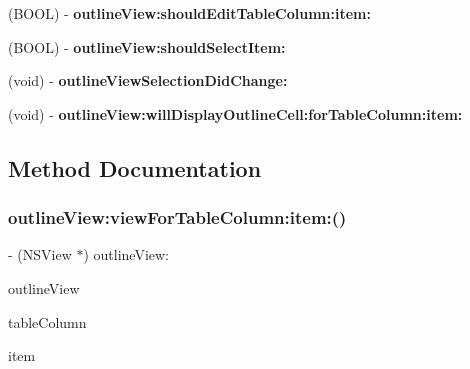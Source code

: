 \begin{DoxyCompactItemize}
\item 
\mbox{\label{category_captured_traffic_07_delegate_08_a33aecc5285a4240cfaf18f9f6fbc706e}} 
(B\+O\+OL) -\/ {\bfseries outline\+View\+:should\+Edit\+Table\+Column\+:item\+:}
\item 
\mbox{\label{category_captured_traffic_07_delegate_08_a2cf9d9ebaf56e1f0f77608b43cc3b03f}} 
(B\+O\+OL) -\/ {\bfseries outline\+View\+:should\+Select\+Item\+:}
\item 
\mbox{\label{category_captured_traffic_07_delegate_08_a0ccd600588949a0b9c965e7d0fcb53ec}} 
(void) -\/ {\bfseries outline\+View\+Selection\+Did\+Change\+:}
\item 
\mbox{\label{category_captured_traffic_07_delegate_08_aa2b4f4a337e6a21450dc24664f8e6ab1}} 
(void) -\/ {\bfseries outline\+View\+:will\+Display\+Outline\+Cell\+:for\+Table\+Column\+:item\+:}
\end{DoxyCompactItemize}


\subsection{Method Documentation}
\mbox{\label{category_captured_traffic_07_delegate_08_a819263857354e5b56f58dbe5995aaf8c}} 
\subsubsection{\texorpdfstring{outline\+View\+:view\+For\+Table\+Column\+:item\+:()}{outlineView:viewForTableColumn:item:()}}
{\footnotesize\ttfamily -\/ (N\+S\+View $\ast$) outline\+View\+: \begin{DoxyParamCaption}\item[{(N\+S\+Outline\+View $\ast$)}]{outline\+View }\item[{viewForTableColumn:(N\+S\+Table\+Column $\ast$)}]{table\+Column }\item[{item:(id)}]{item }\end{DoxyParamCaption}}

